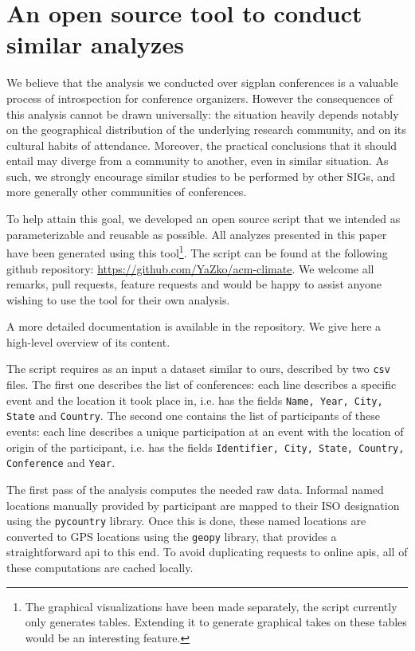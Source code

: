 \section{An open source tool to conduct similar analyzes}
\label{sec:software}

We believe that the analysis we conducted over sigplan conferences is a valuable
process of introspection for conference organizers. However the consequences of
this analysis cannot be drawn universally: the situation heavily depends notably
on the geographical distribution of the underlying research community, and on its
cultural habits of attendance. Moreover, the practical conclusions that it should
entail may diverge from a community to another, even in similar situation.
As such, we strongly encourage similar studies to be performed by other SIGs, and more
generally other communities of conferences.

To help attain this goal, we developed an open source \python{} script that we
intended as parameterizable and reusable as possible. All analyzes presented in
this paper have been generated using this tool\footnote{The graphical
  visualizations have been made separately, the script currently only generates
  tables. Extending it to generate graphical takes on these tables would be an
  interesting feature.}. The script can be found at the following github repository:
\url{https://github.com/YaZko/acm-climate}.
We welcome all remarks, pull requests, feature requests and would be happy to assist
anyone wishing to use the tool for their own analysis.

A more detailed documentation is available in the repository. We give here a high-level overview
of its content.

The script requires as an input a dataset similar to ours, described by two
\texttt{csv} files. The first one describes the list of conferences: each line
describes a specific event and the location it took place in, i.e. has the
fields \texttt{Name, Year, City, State} and \texttt{Country}. The second one
contains the list of participants of these events: each line describes a unique
participation at an event with the location of origin of the participant, i.e.
has the fields \texttt{Identifier, City, State, Country, Conference} and
\texttt{Year}.

The first pass of the analysis computes the needed raw data. 
Informal named locations manually provided by participant are mapped to their
ISO designation using the \texttt{pycountry} library.
Once this is done, these named locations are converted to GPS
locations using the \texttt{geopy} library, that provides a straightforward api
to this end.
To avoid duplicating requests to online apis, all of these computations are cached
locally.

